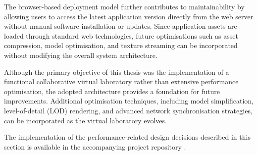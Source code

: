 The browser-based deployment model further contributes to maintainability by allowing users to access the latest application version directly from the web server without manual software installation or updates. Since application assets are loaded through standard web technologies, future optimisations such as asset compression, model optimisation, and texture streaming can be incorporated without modifying the overall system architecture.

Although the primary objective of this thesis was the implementation of a functional collaborative virtual laboratory rather than extensive performance optimisation, the adopted architecture provides a foundation for future improvements. Additional optimisation techniques, including model simplification, level-of-detail (LOD) rendering, and advanced network synchronisation strategies, can be incorporated as the virtual laboratory evolves.

The implementation of the performance-related design decisions described in this section is available in the accompanying project repository \cite{thesisRepo}.
